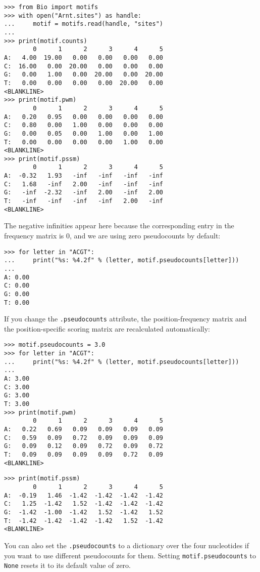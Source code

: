 \begin{verbatim}
>>> from Bio import motifs
>>> with open("Arnt.sites") as handle:
...     motif = motifs.read(handle, "sites")
...
>>> print(motif.counts)
        0      1      2      3      4      5
A:   4.00  19.00   0.00   0.00   0.00   0.00
C:  16.00   0.00  20.00   0.00   0.00   0.00
G:   0.00   1.00   0.00  20.00   0.00  20.00
T:   0.00   0.00   0.00   0.00  20.00   0.00
<BLANKLINE>
>>> print(motif.pwm)
        0      1      2      3      4      5
A:   0.20   0.95   0.00   0.00   0.00   0.00
C:   0.80   0.00   1.00   0.00   0.00   0.00
G:   0.00   0.05   0.00   1.00   0.00   1.00
T:   0.00   0.00   0.00   0.00   1.00   0.00
<BLANKLINE>
>>> print(motif.pssm)
        0      1      2      3      4      5
A:  -0.32   1.93   -inf   -inf   -inf   -inf
C:   1.68   -inf   2.00   -inf   -inf   -inf
G:   -inf  -2.32   -inf   2.00   -inf   2.00
T:   -inf   -inf   -inf   -inf   2.00   -inf
<BLANKLINE>
\end{verbatim}
The negative infinities appear here because the corresponding entry in the frequency matrix is 0, and we are using zero pseudocounts by default:

\begin{verbatim}
>>> for letter in "ACGT":
...     print("%s: %4.2f" % (letter, motif.pseudocounts[letter]))
...
A: 0.00
C: 0.00
G: 0.00
T: 0.00
\end{verbatim}
If you change the \verb+.pseudocounts+ attribute, the position-frequency matrix and the position-specific scoring matrix are recalculated automatically:

\begin{verbatim}
>>> motif.pseudocounts = 3.0
>>> for letter in "ACGT":
...     print("%s: %4.2f" % (letter, motif.pseudocounts[letter]))
...
A: 3.00
C: 3.00
G: 3.00
T: 3.00
>>> print(motif.pwm)
        0      1      2      3      4      5
A:   0.22   0.69   0.09   0.09   0.09   0.09
C:   0.59   0.09   0.72   0.09   0.09   0.09
G:   0.09   0.12   0.09   0.72   0.09   0.72
T:   0.09   0.09   0.09   0.09   0.72   0.09
<BLANKLINE>
\end{verbatim}

\begin{verbatim}
>>> print(motif.pssm)
        0      1      2      3      4      5
A:  -0.19   1.46  -1.42  -1.42  -1.42  -1.42
C:   1.25  -1.42   1.52  -1.42  -1.42  -1.42
G:  -1.42  -1.00  -1.42   1.52  -1.42   1.52
T:  -1.42  -1.42  -1.42  -1.42   1.52  -1.42
<BLANKLINE>
\end{verbatim}
You can also set the \verb+.pseudocounts+ to a dictionary over the four nucleotides if you want to use different pseudocounts for them. Setting \verb+motif.pseudocounts+ to \verb+None+ resets it to its default value of zero.

